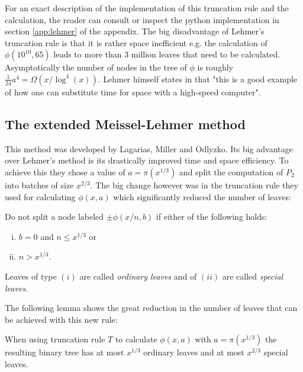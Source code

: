 For an exact description of the implementation of this truncation rule and the calculation, the reader can consult \cite{lehmer59}
or inspect the python implementation in section \ref{app:lehmer} of the appendix.
The big disadvantage of Lehmer's truncation rule is that it is rather space inefficient e.g.
the calculation of $\phi(10^{10},65)$ leads to more than $3$ million leaves that need to be calculated.
Asymptotically the number of nodes in the tree of $\phi$ is roughly $\frac{1}{24} a^{4} = \Omega(x / \log^{4}(x))$.
Lehmer himself states in \cite{lehmer59} that "this is a good example of how one can substitute time for space with a high-speed computer".

\subsection{The extended Meissel-Lehmer method}\label{sec:lmo}
This method was developed by Lagarias, Miller and Odlyzko. 
Its big advantage over Lehmer's method is its drastically improved time and space efficiency. To achieve this 
they chose a value of $a = \pi(x^{1/3})$ and split the computation of $P_{2}$ into batches of size $x^{2 / 3}$.
The big change however was in the truncation rule they used for calculating $\phi(x,a)$ which significantly reduced the number of leaves:

\begin{definition}
	Do not split a node labeled $\pm \phi(x / n,b)$ if either of the following holds:
	\begin{enumerate}[(i)]
		\item $b=0$ and $n \leq x^{1 / 3}$ or
		\item $n > x^{1 / 3}$.
	\end{enumerate}
	Leaves of type $(i)$ are called \emph{ordinary leaves} and of $(ii)$ are called \emph{special leaves}.
\end{definition}
The following lemma shows the great reduction in the number of leaves that can be achieved with this new rule:

\begin{lemma}
	When using truncation rule $T$ to calculate $\phi(x,a)$ with $a = \pi(x^{1 / 3})$ the resulting binary tree has at most $x^{1 / 3}$ ordinary leaves 
	and at most $x^{2 / 3}$ special leaves.
\end{lemma}

